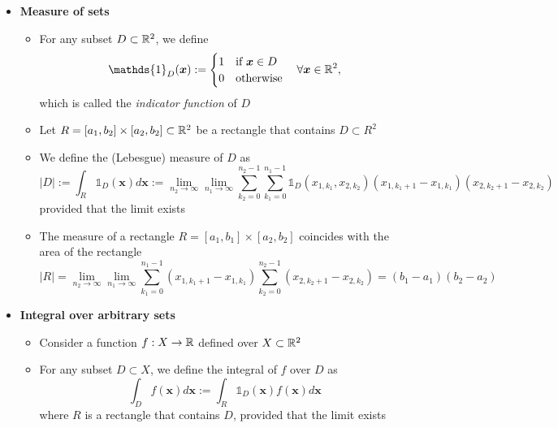 \documentclass[12pt,a4paper]{article}
\begin{document}
\begin{itemize}
\item \textbf{Measure of sets}
  \begin{itemize}
  \item For any subset $D\subset \mathbb{R}^{2}$, we define
    \begin{equation}\nonumber%
      \mathds{1}_{D}(\bm{x}) :=
      \begin{cases}
        1 & \text{if $\bm{x}\in D$} \\
        0 & \text{otherwise} \\
      \end{cases}
      \quad \forall \bm{x} \in \R^{2},
    \end{equation}
    which is called the \emph{indicator function} of $D$
  \item Let $R=[a_{1},b_{2}]\times [a_{2},b_{2}]\subset \mathbb{R}^{2}$ be a rectangle that contains $D\subset R^{2}$
  \item We define the (Lebesgue) measure of $D$ as
    \begin{equation}\nonumber%
      |D|:=\int_{R}\mathds{1}_{D}(\bm{x})d\bm{x} :=
      \lim_{n_{2}\to\infty}\lim_{n_{1}\to\infty}
      \sum_{k_{2}=0}^{n_{2}-1}\sum_{k_{1}=0}^{n_{1}-1}\mathds{1}_{D}(x_{1,k_{1}},x_{2,k_{2}})(x_{1,k_{1}+1}-x_{1,k_{1}})(x_{2,k_{2}+1}-x_{2,k_{2}})
    \end{equation}
    provided that the limit exists
  \item The measure of a rectangle $R=[a_{1},b_{1}]\times[a_{2},b_{2}]$ coincides with the area of the rectangle
    \begin{equation}\nonumber%
      |R| =
      \lim_{n_{2}\to\infty}\lim_{n_{1}\to\infty}
      \sum_{k_{1}=0}^{n_{1}-1}(x_{1,k_{1}+1}-x_{1,k_{1}})\sum_{k_{2}=0}^{n_{2}-1}(x_{2,k_{2}+1}-x_{2,k_{2}})
      = (b_{1}-a_{1})(b_{2}-a_{2})
    \end{equation}
  \end{itemize}

\item \textbf{Integral over arbitrary sets}
  \begin{itemize}
  \item Consider a function $f:X \to \mathbb{R}$ defined over $X\subset \mathbb{R}^{2}$
  \item For any subset $D\subset X$, 
    we define the integral of $f$ over $D$ as
    \begin{equation}\nonumber%
      \int_{D}f(\bm{x})d\bm{x} := \int_{R}\mathds{1}_{D}(\bm{x})f(\bm{x})d\bm{x}
    \end{equation}
    where $R$ is a rectangle that contains $D$, provided that the limit exists
  \end{itemize}

\end{itemize}
\end{document}
